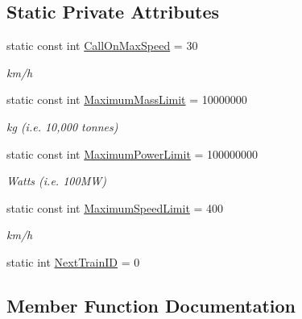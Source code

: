 \subsection*{Static Private Attributes}
\begin{DoxyCompactItemize}
\item 
\mbox{\label{class_t_train_a70e34e0666fd1c04b6c9866bfe45290f}} 
static const int \mbox{\hyperlink{class_t_train_a70e34e0666fd1c04b6c9866bfe45290f}{Call\+On\+Max\+Speed}} = 30
\begin{DoxyCompactList}\small\item\em km/h \end{DoxyCompactList}\item 
\mbox{\label{class_t_train_a1ab673136ad153947d373b5fd48a50e9}} 
static const int \mbox{\hyperlink{class_t_train_a1ab673136ad153947d373b5fd48a50e9}{Maximum\+Mass\+Limit}} = 10000000
\begin{DoxyCompactList}\small\item\em kg (i.\+e. 10,000 tonnes) \end{DoxyCompactList}\item 
\mbox{\label{class_t_train_a06452bf9f2c18e9d83d4b33cc24ada42}} 
static const int \mbox{\hyperlink{class_t_train_a06452bf9f2c18e9d83d4b33cc24ada42}{Maximum\+Power\+Limit}} = 100000000
\begin{DoxyCompactList}\small\item\em Watts (i.\+e. 100\+MW) \end{DoxyCompactList}\item 
\mbox{\label{class_t_train_afac2548a159e8c341c008810d15e2a88}} 
static const int \mbox{\hyperlink{class_t_train_afac2548a159e8c341c008810d15e2a88}{Maximum\+Speed\+Limit}} = 400
\begin{DoxyCompactList}\small\item\em km/h \end{DoxyCompactList}\item 
static int \mbox{\hyperlink{class_t_train_a59a6ad055b319a73e954e9bef5f7593c}{Next\+Train\+ID}} = 0
\end{DoxyCompactItemize}


\subsection{Member Function Documentation}
\mbox{\label{class_t_train_a50997f7e8138a7e6a147fe3b5ad21b84}} 
